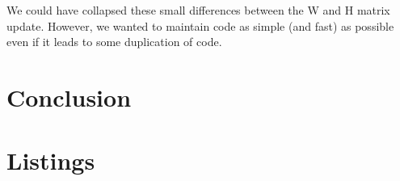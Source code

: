 \documentclass[a4paper,12pt]{article}
\newcommand{\javalisting}[2]{
	
}
\begin{document}
We could have collapsed these small differences between the W and H matrix update.
However, we wanted to maintain code as simple (and fast) as possible even if it leads to some duplication of code.



\section{Conclusion}
\label{conclusion}


\nocite{*}
\appendix
\section*{Listings}
\label{sec:listings}

\javalisting{Map1Text}{Code of the first Map Reduce phase implemented using Text. We assume that the vector is saved on multiple files stored in a folder with the filename starting with V. Similarly for the matrix A. }

\pagebreak

\javalisting{IntAndIdWritable}{IntAndIdWritable class. This class implements both methods from the Writable and the Comparable interface. We omitted constructors and getter/setter methods for clarity.}

\javalisting{HPhase1}{First phase of matrix vector multiplication (Figure \ref{fig:Map1}).}




\end{document}
